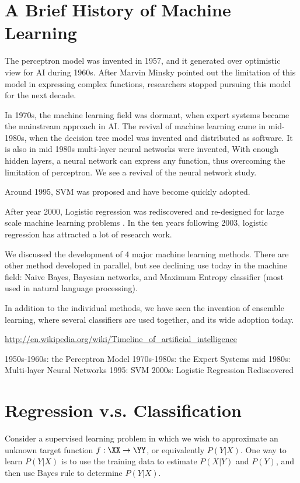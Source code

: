 \documentclass{book}
\begin{document}
\chapter{A Brief History of Machine Learning}
The perceptron model was invented in 1957, and it generated over optimistic view for AI during 1960s. After Marvin Minsky pointed out the limitation of this model in expressing complex functions, researchers stopped pursuing this model for the next decade.

In 1970s, the machine learning field was dormant, when expert systems became the mainstream approach in AI.  The revival of machine learning came in mid-1980s, when the decision tree model was invented and distributed as software. It is also in mid 1980s multi-layer neural networks were invented, With enough hidden layers, a neural network can express any function, thus overcoming the limitation of perceptron. We see a revival of the neural network study.

Around 1995, SVM was proposed and have become quickly adopted.

After year 2000, Logistic regression was rediscovered and re-designed for large scale machine learning problems . In the ten years following 2003, logistic regression has attracted a lot of research work.

We discussed the development of 4 major machine learning methods. There are other method developed in parallel, but see declining use today in the machine field: Naive Bayes, Bayesian networks, and Maximum Entropy classifier (most used in natural language processing). 

In addition to the individual methods, we have seen the invention of ensemble learning, where several classifiers are used together, and its wide adoption today. 


\url{http://en.wikipedia.org/wiki/Timeline_of_artificial_intelligence}

1950s-1960s: the Perceptron Model
1970s-1980s: the Expert Systems
mid 1980s: Multi-layer Neural Networks
1995: SVM
2000s: Logistic Regression Rediscovered



\chapter{Regression v.s. Classification}
Consider a supervised learning problem in which we wish to approximate an unknown target function $f: \XX \to \YY$, or equivalently $P(Y|X)$. One way to learn $P(Y|X)$ is to use the training data to estimate $P(X|Y)$ and $P(Y)$, and then use Bayes rule to determine $P(Y|X)$.
\end{document}
